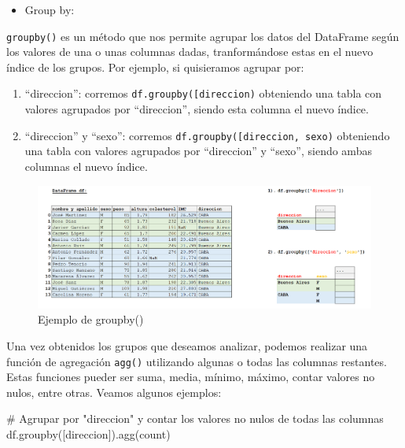 \documentclass[
  letterpaper,
  DIV=11,
  numbers=noendperiod]{scrreprt}
\newenvironment{Shaded}{\begin{snugshade}}{\end{snugshade}}
\newcommand{\CommentTok}[1]{\textcolor[rgb]{0.37,0.37,0.37}{#1}}
\newcommand{\NormalTok}[1]{\textcolor[rgb]{0.00,0.23,0.31}{#1}}
\newcommand{\StringTok}[1]{\textcolor[rgb]{0.13,0.47,0.30}{#1}}
\providecommand{\tightlist}{%
  \setlength{\itemsep}{0pt}\setlength{\parskip}{0pt}}\usepackage{longtable,booktabs,array}
\begin{document}
\begin{itemize}
\tightlist
\item
  Group by:
\end{itemize}

\texttt{groupby()} es un método que nos permite agrupar los datos del
DataFrame según los valores de una o unas columnas dadas, tranformándose
estas en el nuevo índice de los grupos. Por ejemplo, si quisieramos
agrupar por:

\begin{enumerate}
\def\labelenumi{\arabic{enumi}.}
\item
  ``direccion'': corremos
  \texttt{df.groupby({[}\textquotesingle{}direccion\textquotesingle{}{]})}
  obteniendo una tabla con valores agrupados por ``direccion'', siendo
  esta columna el nuevo índice.
\item
  ``direccion'' y ``sexo'': corremos
  \texttt{df.groupby({[}\textquotesingle{}direccion\textquotesingle{},\ \textquotesingle{}sexo\textquotesingle{}{]})}
  obteniendo una tabla con valores agrupados por ``direccion'' y
  ``sexo'', siendo ambas columnas el nuevo índice.
\end{enumerate}

\begin{figure}[H]

{\centering \includegraphics{./imgs/unidad_6/groupby.png}

}

\caption{Ejemplo de groupby()}

\end{figure}%

Una vez obtenidos los grupos que deseamos analizar, podemos realizar una
función de agregación \texttt{agg()} utilizando algunas o todas las
columnas restantes. Estas funciones pueder ser suma, media, mínimo,
máximo, contar valores no nulos, entre otras. Veamos algunos ejemplos:

\begin{Shaded}
\begin{Highlighting}[]
\CommentTok{\# Agrupar por "direccion" y contar los valores no nulos de todas las columnas}
\NormalTok{df.groupby([}\StringTok{\textquotesingle{}direccion\textquotesingle{}}\NormalTok{]).agg(}\StringTok{\textquotesingle{}count\textquotesingle{}}\NormalTok{)}
\end{Highlighting}
\end{Shaded}
\end{document}
